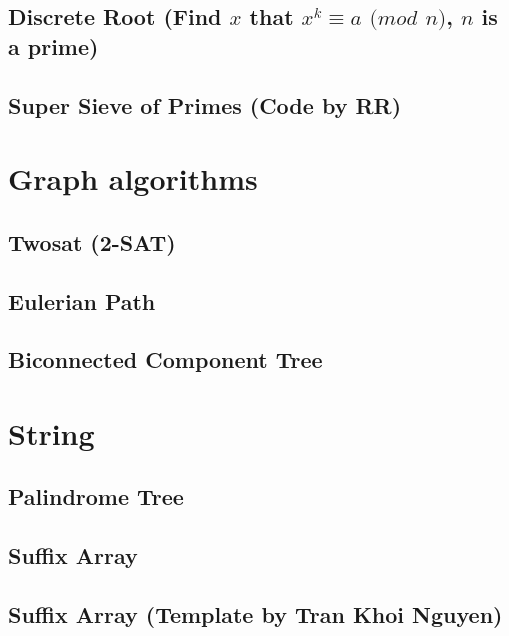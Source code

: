 \subsection{Discrete Root (Find $x$ that $x^k \equiv a$ $(mod$ $n)$, $n$ is a prime)}
\raggedbottom
\hrulefill
\subsection{Super Sieve of Primes (Code by RR)}
\raggedbottom
\hrulefill

\section{Graph algorithms}
\subsection{Twosat (2-SAT)}
\raggedbottom
\hrulefill
\subsection{Eulerian Path}
\raggedbottom
\hrulefill
\subsection{Biconnected Component Tree}
\raggedbottom
\hrulefill

\section{String}
\subsection{Palindrome Tree}
\raggedbottom
\hrulefill
\subsection{Suffix Array}
\raggedbottom
\hrulefill
\subsection{Suffix Array (Template by Tran Khoi Nguyen)}
\raggedbottom
\hrulefill
